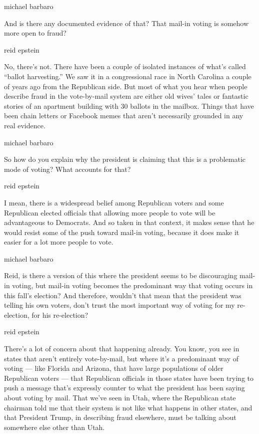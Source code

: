 michael barbaro

And is there any documented evidence of that? That mail-in voting is
somehow more open to fraud?

reid epstein

No, there's not. There have been a couple of isolated instances of
what's called ``ballot harvesting.'' We saw it in a congressional race
in North Carolina a couple of years ago from the Republican side. But
most of what you hear when people describe fraud in the vote-by-mail
system are either old wives' tales or fantastic stories of an apartment
building with 30 ballots in the mailbox. Things that have been chain
letters or Facebook memes that aren't necessarily grounded in any real
evidence.

michael barbaro

So how do you explain why the president is claiming that this is a
problematic mode of voting? What accounts for that?

reid epstein

I mean, there is a widespread belief among Republican voters and some
Republican elected officials that allowing more people to vote will be
advantageous to Democrats. And so taken in that context, it makes sense
that he would resist some of the push toward mail-in voting, because it
does make it easier for a lot more people to vote.

michael barbaro

Reid, is there a version of this where the president seems to be
discouraging mail-in voting, but mail-in voting becomes the predominant
way that voting occurs in this fall's election? And therefore, wouldn't
that mean that the president was telling his own voters, don't trust the
most important way of voting for my re-election, for his re-election?

reid epstein

There's a lot of concern about that happening already. You know, you see
in states that aren't entirely vote-by-mail, but where it's a
predominant way of voting --- like Florida and Arizona, that have large
populations of older Republican voters --- that Republican officials in
those states have been trying to push a message that's expressly counter
to what the president has been saying about voting by mail. That we've
seen in Utah, where the Republican state chairman told me that their
system is not like what happens in other states, and that President
Trump, in describing fraud elsewhere, must be talking about somewhere
else other than Utah.

